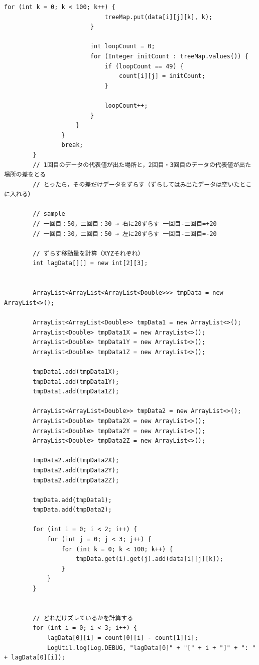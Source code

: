 \documentclass[11pt]{jreport}
\begin{document}
\begin{lstlisting}[caption=ズレ修正アルゴリズム, label=correctDeviation]
                        for (int k = 0; k < 100; k++) {
                            treeMap.put(data[i][j][k], k);
                        }

                        int loopCount = 0;
                        for (Integer initCount : treeMap.values()) {
                            if (loopCount == 49) {
                                count[i][j] = initCount;
                            }

                            loopCount++;
                        }
                    }
                }
                break;
        }
        // 1回目のデータの代表値が出た場所と，2回目・3回目のデータの代表値が出た場所の差をとる
        // とったら，その差だけデータをずらす（ずらしてはみ出たデータは空いたとこに入れる）

        // sample
        // 一回目：50，二回目：30 → 右に20ずらす 一回目-二回目=+20
        // 一回目：30，二回目：50 → 左に20ずらす 一回目-二回目=-20

        // ずらす移動量を計算（XYZそれぞれ）
        int lagData[][] = new int[2][3];


        ArrayList<ArrayList<ArrayList<Double>>> tmpData = new ArrayList<>();

        ArrayList<ArrayList<Double>> tmpData1 = new ArrayList<>();
        ArrayList<Double> tmpData1X = new ArrayList<>();
        ArrayList<Double> tmpData1Y = new ArrayList<>();
        ArrayList<Double> tmpData1Z = new ArrayList<>();

        tmpData1.add(tmpData1X);
        tmpData1.add(tmpData1Y);
        tmpData1.add(tmpData1Z);

        ArrayList<ArrayList<Double>> tmpData2 = new ArrayList<>();
        ArrayList<Double> tmpData2X = new ArrayList<>();
        ArrayList<Double> tmpData2Y = new ArrayList<>();
        ArrayList<Double> tmpData2Z = new ArrayList<>();

        tmpData2.add(tmpData2X);
        tmpData2.add(tmpData2Y);
        tmpData2.add(tmpData2Z);

        tmpData.add(tmpData1);
        tmpData.add(tmpData2);

        for (int i = 0; i < 2; i++) {
            for (int j = 0; j < 3; j++) {
                for (int k = 0; k < 100; k++) {
                    tmpData.get(i).get(j).add(data[i][j][k]);
                }
            }
        }


        // どれだけズレているかを計算する
        for (int i = 0; i < 3; i++) {
            lagData[0][i] = count[0][i] - count[1][i];
            LogUtil.log(Log.DEBUG, "lagData[0]" + "[" + i + "]" + ": " + lagData[0][i]);


\end{lstlisting}
\end{document}
